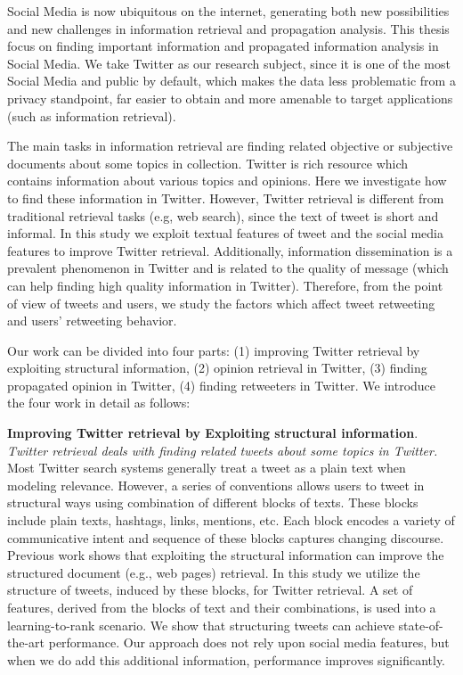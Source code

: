 \begin{eabstract}


Social Media is now ubiquitous on the internet, generating both new possibilities and new challenges in information retrieval and propagation analysis. This thesis focus on finding important information and propagated information analysis in Social Media. We take Twitter as our research subject, since it is one of the most Social Media and  public by default, which makes the data less problematic from a privacy standpoint, far easier to obtain
and more amenable to target applications (such as information retrieval). 

The main tasks in information retrieval are finding related objective or subjective documents about some topics in collection. Twitter is rich resource which contains information about various topics and opinions. Here we investigate how to find these information in Twitter. However, Twitter retrieval is different from traditional retrieval tasks (e.g, web search), since the text of tweet is short and informal. In this study we exploit textual features of tweet and the social media features to improve Twitter retrieval. Additionally, information dissemination is a prevalent phenomenon in Twitter and is related to the quality of message (which can help finding high quality information in Twitter). Therefore, from the point of view of tweets and users, we study the factors which affect tweet retweeting and users' retweeting behavior.
 
Our work can be divided into four parts: (1) improving Twitter retrieval by exploiting structural information, (2) opinion retrieval in Twitter, (3) finding propagated opinion in Twitter, (4) finding retweeters in Twitter. We introduce the four work in detail as follows:

\textbf{Improving Twitter retrieval by Exploiting structural information}. \emph{Twitter retrieval deals with finding related tweets about some topics in Twitter.} Most Twitter search systems generally treat a tweet as a plain text when modeling relevance. However, a series of conventions allows users to tweet in structural ways using combination of different blocks of texts. These blocks include plain texts, hashtags, links, mentions, etc. Each block encodes a variety of communicative intent and sequence of these blocks captures changing discourse. Previous work shows that exploiting the structural information can improve the structured document (e.g., web pages) retrieval. In this study we utilize the structure of tweets, induced by these blocks, for Twitter retrieval. A set of features, derived from the blocks of text and their combinations, is used into a learning-to-rank scenario. We show that structuring tweets can achieve state-of-the-art performance. Our approach does not rely upon social media features, but when we do add this additional information, performance improves significantly. 


\end{eabstract}
